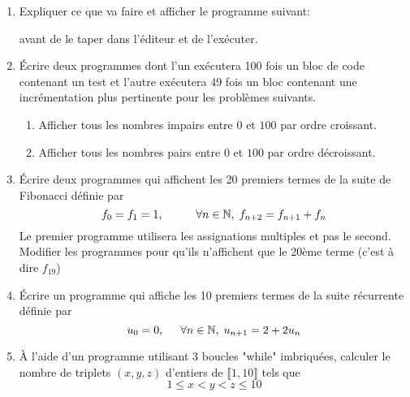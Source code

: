 \begin{enumerate}
  \item Expliquer ce que va faire et afficher le programme suivant:
  
avant de le taper dans l'éditeur et de l'exécuter.

  \item \'Ecrire deux programmes dont l'un exécutera 100 fois un bloc de code contenant un test et l'autre exécutera 49 fois un bloc contenant une incrémentation plus pertinente pour les problèmes suivants.
\begin{enumerate}
  \item Afficher tous les nombres impairs entre $0$ et $100$ par ordre croissant.
  \item Afficher tous les nombres pairs entre $0$ et $100$ par ordre décroissant.
\end{enumerate}

  \item \'Ecrire deux programmes qui affichent les 20 premiers termes de la suite de Fibonacci définie par
\begin{displaymath}
  f_0 = f_1 = 1, \hspace{1cm}\forall n \in \mathbb{N},\; f_{n+2} = f_{n+1} + f_n
\end{displaymath}
Le premier programme utilisera les assignations multiples et pas le second. Modifier les programmes pour qu'ils n'affichent que le 20ème terme (c'est à dire $f_{19}$)

  \item \'Ecrire un programme qui affiche les 10 premiers termes de la suite récurrente définie par
\begin{displaymath}
  u_0 = 0, \hspace{0.5cm} \forall n \in \mathbb{N}, \;u_{n+1} = 2 + 2u_n
\end{displaymath}

  \item \`A l'aide d'un programme utilisant 3 boucles "while" imbriquées, calculer le nombre de triplets $(x,y,z)$ d'entiers de $\llbracket 1, 10 \rrbracket$ tels que
  \begin{displaymath}
  1  \leq x < y < z \leq 10
  \end{displaymath}

\end{enumerate}
